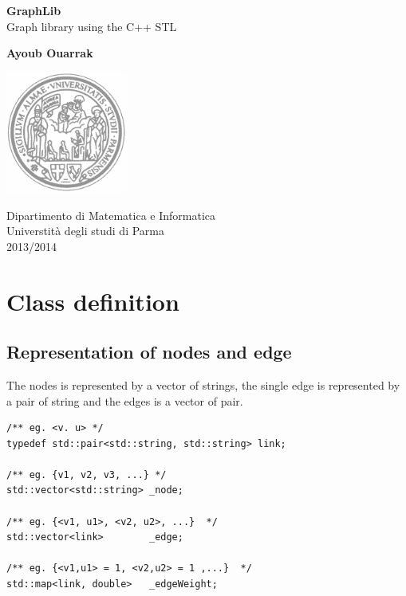 \documentclass[10pt,a4paper]{article}
\begin{document}
\begin{titlepage}
\begin{center}
\vspace*{1cm}
\Huge
\textbf{GraphLib}
\vspace{0.5cm}
\LARGE
\\
Graph library using the C++ STL
        
\vspace{1.5cm}
\textbf{Ayoub Ouarrak}
\vfill
        
\vspace{0.8cm}
\begin{center}
\includegraphics[width=4.0cm]{Unipr.png} 
\end{center}
\Large
Dipartimento di Matematica e Informatica\\
Universtità degli studi di Parma\\
2013/2014        
\end{center}
\end{titlepage}
\newpage
\tableofcontents

\newpage
\section{Class definition}
\subsection{Representation of nodes and edge}
The nodes is represented by a vector of strings, the single edge is represented by a pair of string and the edges is a vector of pair.\\
\begin{lstlisting}
/** eg. <v. u> */
typedef std::pair<std::string, std::string> link;  

/** eg. {v1, v2, v3, ...} */
std::vector<std::string> _node;     

/** eg. {<v1, u1>, <v2, u2>, ...}  */  
std::vector<link>        _edge;   
   
/** eg. {<v1,u1> = 1, <v2,u2> = 1 ,...}  */    
std::map<link, double>   _edgeWeight; 
\end{lstlisting}
\end{document}
